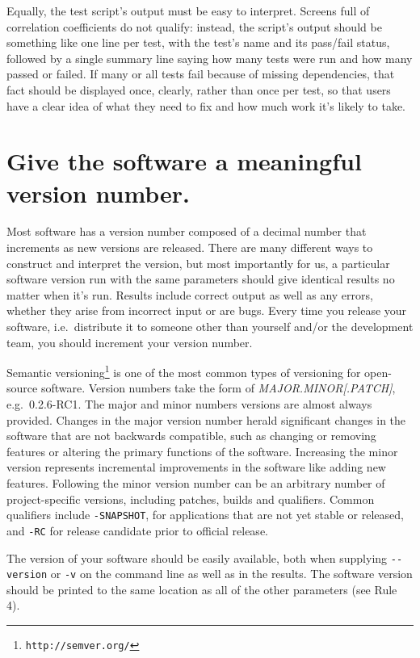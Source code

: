 \documentclass[10pt]{article}
\newcommand{\withurl}[2]{{#1}\footnote{\texttt{#2}}}
\begin{document}
Equally, the test script's output must be easy to interpret. Screens
full of correlation coefficients do not qualify: instead, the script's
output should be something like one line per test, with the test's name
and its pass/fail status, followed by a single summary line saying how
many tests were run and how many passed or failed. If many or all tests
fail because of missing dependencies, that fact should be displayed
once, clearly, rather than once per test, so that users have a clear
idea of what they need to fix and how much work it's likely to take.

\section{Give the software a meaningful version number.}

Most software has a version number composed of a decimal number that
increments as new versions are released. There are many different ways
to construct and interpret the version, but most importantly for us, a
particular software version run with the same parameters should give
identical results no matter when it's run. Results include correct
output as well as any errors, whether they arise from incorrect input or
are bugs. Every time you release your software, i.e.~distribute it to
someone other than yourself and/or the development team, you should
increment your version number.

\withurl{Semantic versioning}{http://semver.org/} is one of the most common
types of versioning for open-source software. Version numbers take the
form of \emph{MAJOR.MINOR{[}.PATCH{]}}, e.g.~0.2.6-RC1. The major and
minor numbers versions are almost always provided. Changes in the major
version number herald significant changes in the software that are not
backwards compatible, such as changing or removing features or altering
the primary functions of the software. Increasing the minor version
represents incremental improvements in the software like adding new
features. Following the minor version number can be an arbitrary number
of project-specific versions, including patches, builds and qualifiers.
Common qualifiers include \texttt{-SNAPSHOT}, for applications that are
not yet stable or released, and \texttt{-RC} for release candidate prior
to official release.

The version of your software should be easily available, both when
supplying \texttt{-\/-version} or \texttt{-v} on the command line as
well as in the results. The software version should be printed to the
same location as all of the other parameters (see Rule 4).
\end{document}
